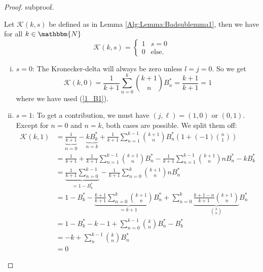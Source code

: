 \begin{proof}
	subproof.
	\begin{lemma}
		\label{Alg:Lemma:BadSublemma2}
		Let $\mathcal{K}(k,s)$ be defined as in Lemma 
		\ref{Alg:Lemma:Badsublemma1}, then we have for all $k\in \mathbbm{N}$
		\begin{equation*}
			\mathcal{K}(k, s)
			=
			\begin{cases}
				1 & s=0 \\
				0 & \text{else}.		
			\end{cases}
		\end{equation*}
	\end{lemma}
	\begin{subproof}
		\mbox{}
		\begin{enumerate}[(i)]
		  \item $s=0$:
			The Kronecker-delta will always be zero unless $l=j=0$. So we get
			\begin{equation*}
				\mathcal{K}(k,0)
				=
				\frac{1}{k+1} \sum\limits_{n=0}^k
				\binom{k+1}{n} B_n^*
				=
				\frac{k+1}{k+1}
				=
				1
			\end{equation*}
			where we have used (\ref{1_B1}).

			\item $s=1$:
			To get a contribution, we must have $(j, \ell) = (1,0)$ or
			 $(0,1)$. Except for $n=0$ and $n=k$, both cases are possible. We 
			 split them off:
			\begin{align*}
				\mathcal{K}(k,1)
				& = 
				\underbrace{\frac{1}{k+1}}_{n=0}
				- \underbrace{k B_k^*}_{n=k}
				+ \frac{1}{k+1}
				\sum\limits_{n=1}^{k-1}
				\binom{k+1}{n}B_n^*
				\left(1 + (-1) \binom{n}{1} \right)\\
				& = 
				\frac{1}{k+1}
				+ \frac{1}{k+1} \sum\limits_{n=1}^{k-1}
				\binom{k+1}{n}B_n^* 
				- \frac{1}{k+1}	\sum\limits_{n=1}^{k-1}
				\binom{k+1}{n}n B_n^* 
				- k B_k^* \\
				& = 
				\underbrace{\frac{1}{k+1}
				\sum\limits_{n=0}^{k-1}}_{ = 1 - B_k^*} 
				- \frac{1}{k+1} \sum\limits_{n=0}^k
				\binom{k+1}{n}n B_n^*\\
				& =
				1 - B_k^* 
				- \underbrace{\frac{k+1}{k+1}
				\sum\limits_{n=0}^k
				\binom{k+1}{n} B_n^*}_{ = k+1}
				+ \sum\limits_{n=0}^k 
				\underbrace{\frac{k+1-n}{k+1}
				\binom{k+1}{n}}_{\binom{k}{n}} B_n^*\\
				& = 
				1 - B_k^* - k - 1 
				+ \sum\limits_{n=0}^{k-1}
				\binom{k}{n} B_n^* - B_k^*\\
				& =
				- k + 
				\sum\limits_{n}^{k-1} 
				\binom{k}{n} B_n^*\\
				& = 
				0
			\end{align*}
	

\end{enumerate}
\end{subproof}
\end{proof}
